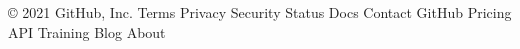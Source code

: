 \newcommand*{\addendumlabel}[1]{\textbf{#1}\hspace{1em}}


\renewcommand{\figurename}{Figure}
\renewcommand{\tablename}{Table}

\long{}

© 2021 GitHub, Inc.
Terms
Privacy
Security
Status
Docs
Contact GitHub
Pricing
API
Training
Blog
About
